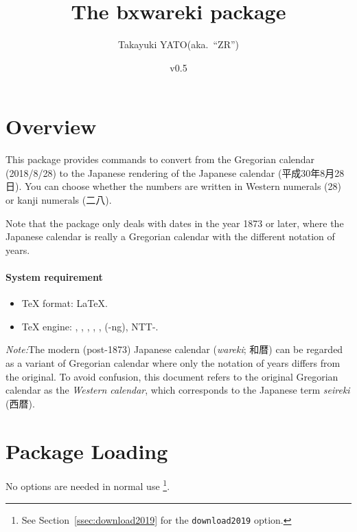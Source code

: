 \documentclass[a4paper]{article}
\newcommand{\PkgVersion}{0.5}
\newcommand{\PkgDate}{2019/04/01}
\newcommand{\Pkg}[1]{\textsf{#1}}
\newcommand{\Note}{\par\noindent\emph{Note:}\quad}
\newcommand*{\Ja}[1]{{\fIpaex#1}}
\newcommand*{\+}{\hspace{0.25em minus 0.25em}}
\begin{document}
\title{The \Pkg{bxwareki} package}
\author{Takayuki YATO\quad (aka.~``ZR'')}
\date{v\PkgVersion \quad[\PkgDate]}
\maketitle

\section{Overview}
\label{sec:Overview}

This package provides commands to convert from the Gregorian calendar
(2018/8/28) to the Japanese rendering of the Japanese calendar
(\Ja{平成\+30\+年\+8\+月\+28\+日}).
You can choose whether the numbers are written
in Western numerals (28) or kanji numerals (\Ja{二八}).

Note that the package only deals with dates in the year 1873 or later,
where the Japanese calendar is really a Gregorian calendar
with the different notation of years.

\paragraph{System requirement}

\begin{itemize}
\item \TeX{} format: \LaTeX.
\item \TeX{} engine: {\pdfTeX}, {\LuaTeX}, {\XeTeX},
  {\pTeX}, {\upTeX}, {\ApTeX} ({\pTeX}-ng), NTT-{\JTeX}.
\end{itemize}

\Note The modern (post-1873) Japanese calendar (\emph{wareki}; \Ja{和暦})
can be regarded as a variant of Gregorian calendar
where only the notation of years differs from the original.
To avoid confusion, this document refers to the original Gregorian
calendar as the \emph{Western calendar},
which corresponds to the Japanese term \emph{seireki} (\Ja{西暦}).

\section{Package Loading}
\label{sec:Loading}

No options are needed in normal use%
\footnote{See Section~\ref{ssec:download2019}
  for the \texttt{download2019} option.}.
\end{document}
